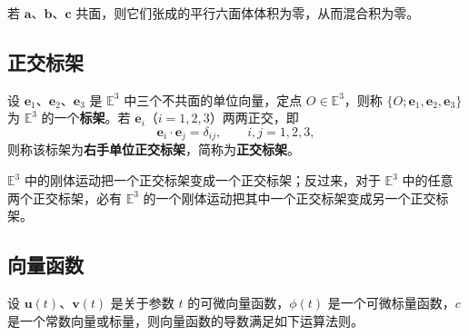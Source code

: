 \begin{remark}
	若 $\boldsymbol{a}$、$\boldsymbol{b}$、$\boldsymbol{c}$ 共面，则它们张成的平行六面体体积为零，从而混合积为零。
\end{remark}

\subsection{正交标架}

\begin{definition}[标架与正交标架]
	设 $\mathbf{e}_1$、$\mathbf{e}_2$、$\mathbf{e}_3$ 是 $\mathbb{E}^3$ 中三个不共面的单位向量，定点 $O\in\mathbb{E}^3$，则称 $\{O;\mathbf{e}_1,\mathbf{e}_2,\mathbf{e}_3\}$ 为 $\mathbb{E}^3$ 的一个\textbf{标架}。若 $\mathbf{e}_i$（$i=1,2,3$）两两正交，即
	\begin{equation}
		\mathbf{e}_i\cdot\mathbf{e}_j=\delta_{ij},\qquad i,j=1,2,3,
		\label{eq:正交标架:正交归一条件}
	\end{equation}
	则称该标架为\textbf{右手单位正交标架}，简称为\textbf{正交标架}。
\end{definition}

\begin{theorem}[刚体运动与正交标架]
	$\mathbb{E}^3$ 中的刚体运动把一个正交标架变成一个正交标架；反过来，对于 $\mathbb{E}^3$ 中的任意两个正交标架，必有 $\mathbb{E}^3$ 的一个刚体运动把其中一个正交标架变成另一个正交标架。
\end{theorem}

\subsection{向量函数}

设 $\boldsymbol{u}(t)$、$\boldsymbol{v}(t)$ 是关于参数 $t$ 的可微向量函数，$\phi(t)$ 是一个可微标量函数，$c$ 是一个常数向量或标量，则向量函数的导数满足如下运算法则。


